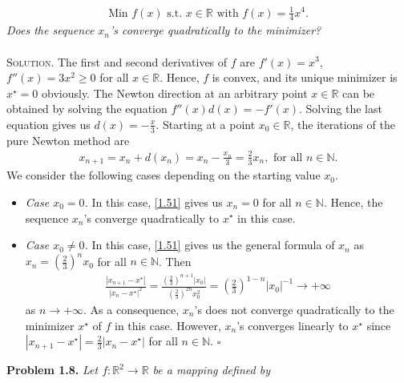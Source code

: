 \documentclass[a4paper]{article}
\numberwithin{equation}{section}
\begin{document}
\begin{align}
\mbox{Min }f\left( x \right) \mbox{ s.t. } x \in \mathbb{R} \mbox{ with } f\left( x \right) = \frac{1}{4}{x^4}.
\end{align}
\textit{Does the sequence $x_n$'s converge quadratically to the minimizer?}\\
\\
\textsc{Solution.} The first and second derivatives of $f$ are $f'\left(x\right)=x^3$, $f''\left(x\right) =3x^2 \ge 0$ for all $x\in \mathbb{R}$. Hence, $f$ is convex, and its unique minimizer is $x^\star=0$ obviously. The Newton direction at an arbitrary point $x\in \mathbb{R}$ can be obtained by solving the equation $f''\left( x \right)d\left( x \right) =  - f'\left( x \right)$. Solving the last equation gives us $d\left( x \right) =  - \frac{x}{3}$. Starting at a point $x_0 \in \mathbb{R}$, the iterations of the pure Newton method are 
\begin{align}
\label{1.51}
{x_{n + 1}} = {x_n} + d\left( {{x_n}} \right) = {x_n} - \frac{{{x_n}}}{3} = \frac{2}{3}{x_n}, \mbox{ for all } n \in \mathbb{N}.
\end{align}
We consider the following cases depending on the starting value $x_0$.
\begin{itemize}
\item \textit{Case $x_0=0$.} In this case, \eqref{1.51} gives us $x_n=0$ for all $n\in \mathbb{N}$. Hence, the sequence $x_n$'s converge quadratically to $x^\star$ in this case.
\item \textit{Case $x_0\ne 0$.} In this case, \eqref{1.51} gives us the general formula of $x_n$ as ${x_n} = {\left( {\frac{2}{3}} \right)^n}{x_0}$ for all $n \in \mathbb{N}$. Then
\begin{align}
\frac{{\left| {{x_{n + 1}} - {x^\star}} \right|}}{{{{\left| {{x_n} - {x^\star}} \right|}^2}}} = \frac{{{{\left( {\frac{2}{3}} \right)}^{n + 1}}\left| {{x_0}} \right|}}{{{{\left( {\frac{2}{3}} \right)}^{2n}}x_0^2}} = {\left( {\frac{2}{3}} \right)^{1 - n}}{\left| {{x_0}} \right|^{ - 1}} \to  + \infty 
\end{align}
as $n \to  + \infty$. As a consequence, $x_n$'s does not converge quadratically to the minimizer $x^\star$ of $f$ in this case. However, $x_n$'s converges linearly to $x^\star$ since $\left| {{x_{n + 1}} - {x^\star}} \right| = \frac{2}{3}\left| {{x_n} - {x^\star}} \right|$ for all $n\in \mathbb{N}$. \hfill $\square$
\end{itemize}
\textbf{Problem 1.8.} \textit{Let $f:\mathbb{R}^2\to \mathbb{R}$ be a mapping defined by}
\end{document}
